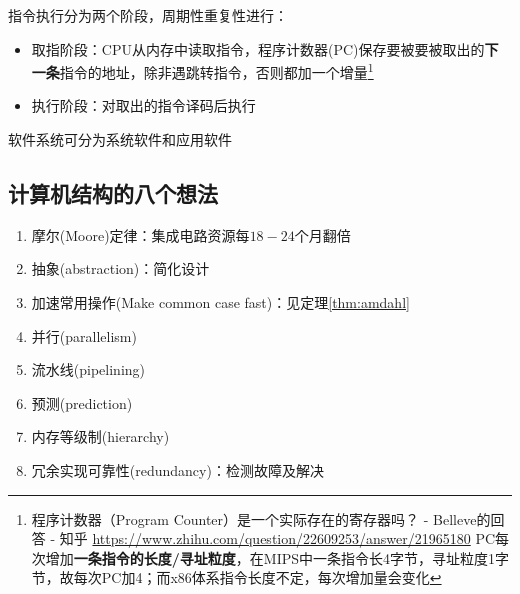 指令执行分为两个阶段，周期性重复性进行：
\begin{itemize}
	\item 取指阶段：CPU从内存中读取指令，程序计数器(PC)保存要被要被取出的\textbf{下一条}指令的地址，除非遇跳转指令，否则都加一个增量\footnote{程序计数器（Program Counter）是一个实际存在的寄存器吗？ - Belleve的回答 - 知乎 \url{https://www.zhihu.com/question/22609253/answer/21965180} PC每次增加\textbf{一条指令的长度/寻址粒度}，在MIPS中一条指令长4字节，寻址粒度1字节，故每次PC加4；而x86体系指令长度不定，每次增加量会变化}
	\item 执行阶段：对取出的指令译码后执行
\end{itemize}
软件系统可分为系统软件和应用软件

\subsection{计算机结构的八个想法}
\begin{enumerate}
	\item 摩尔(Moore)定律：集成电路资源每$18-24$个月翻倍
	\item 抽象(abstraction)：简化设计
	\item 加速常用操作(Make common case fast)：见定理\ref{thm:amdahl}
	\item 并行(parallelism)
	\item 流水线(pipelining)
	\item 预测(prediction)
	\item 内存等级制(hierarchy)
	\item 冗余实现可靠性(redundancy)：检测故障及解决
\end{enumerate}

